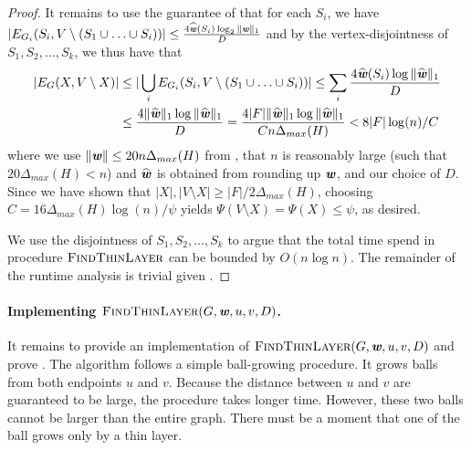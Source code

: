 \begin{proof}
It remains to use the guarantee of  that for each $S_i$, we have $|E_{G_i}(S_i, V \setminus (S_1 \cup \ldots \cup S_i))| \leq \frac{4  \widehat{\boldsymbol{\mathit{w}}}(S_i) \log_2 \|\boldsymbol{{\mathit{w}}}\|_1 }{D}$ and by the vertex-disjointness of $S_1, S_2, \ldots, S_k$, we thus have that
\begin{align*}
    |E_G(X, V \setminus X)| &\leq | \bigcup_i E_{G_i}(S_i, V \setminus (S_1 \cup \ldots \cup S_i))| \leq \sum_i \frac{4  \widehat{\boldsymbol{\mathit{w}}}(S_i) \log \|\widehat{\boldsymbol{\mathit{w}}}\|_1 }{D} \\
    &\leq \frac{4  \|\widehat{\boldsymbol{\mathit{w}}}\|_1 \log \|\widehat{\boldsymbol{\mathit{w}}}\|_1 }{D} =
    \frac{4 |F| \|\widehat{\boldsymbol{\mathit{w}}}\|_1 \log \|\widehat{\boldsymbol{\mathit{w}}}\|_1 }{C n \Delta_{max}(H)} < 8|F| \log(n)/C
\end{align*}
where we use $\|\boldsymbol{{\mathit{w}}}\| \leq 20n \Delta_{max}(H)$ from , that $n$ is reasonably large (such that $20 \Delta_{max}(H) < n$) and $\widehat{\boldsymbol{\mathit{w}}}$ is obtained from rounding up $\boldsymbol{{\mathit{w}}}$, and our choice of $D$. Since we have shown that $|X|, |V \setminus X| \geq |F|/2\Delta_{max}(H)$, choosing $C = 16 \Delta_{max}(H) \log(n)/\psi$ yields $\Psi(V \setminus X) = \Psi(X) \leq \psi$, as desired.

We use the disjointness of $S_1, S_2, \ldots, S_k$ to argue that the total time spend in procedure $\textsc{FindThinLayer}$ can be bounded by $O(n \log n)$. The remainder of the runtime analysis is trivial given .
\end{proof}

\paragraph{Implementing $\textsc{FindThinLayer}(G, \boldsymbol{{\mathit{w}}}, u, v, D)$.}
It remains to provide an implementation of $\textsc{FindThinLayer}(G, \boldsymbol{{\mathit{w}}}, u, v, D)$ and prove .
The algorithm follows a simple ball-growing procedure.
It grows balls from both endpoints $u$ and $v.$
Because the distance between $u$ and $v$ are guaranteed to be large, the procedure takes longer time.
However, these two balls cannot be larger than the entire graph.
There must be a moment that one of the ball grows only by a thin layer.

